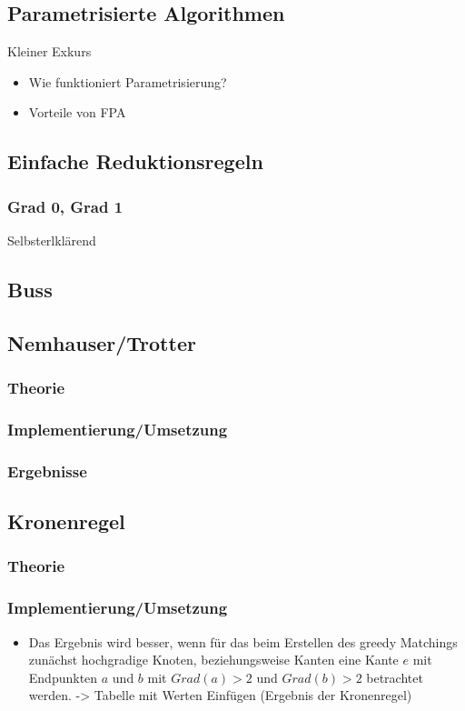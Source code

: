 \documentclass[a4paper]{article}
\begin{document}
\subsection{Parametrisierte Algorithmen}
Kleiner Exkurs
\begin{itemize}
\item Wie funktioniert Parametrisierung?
\item Vorteile von FPA
\end{itemize}
\subsection{Einfache Reduktionsregeln}
\subsubsection{Grad 0, Grad 1}
Selbsterlklärend

\subsection{Buss}

\subsection{Nemhauser/Trotter}

\subsubsection{Theorie}

\subsubsection{Implementierung/Umsetzung}

\subsubsection{Ergebnisse}


\subsection{Kronenregel}

\subsubsection{Theorie}

\subsubsection{Implementierung/Umsetzung}
\begin{itemize}
\item Das Ergebnis wird besser, wenn für das beim Erstellen des greedy Matchings zunächst hochgradige Knoten, beziehungsweise Kanten eine Kante $e$ mit Endpunkten $a$ und $b$ mit $Grad(a) > 2$ und $Grad(b) > 2$ betrachtet werden. -> Tabelle mit Werten Einfügen (Ergebnis der Kronenregel)
\end{itemize}
\end{document}
